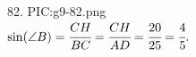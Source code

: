 82. {{PIC:g9-82.png}}\\
$\sin(\angle B)=\cfrac{CH}{BC}=\cfrac{CH}{AD}=\cfrac{20}{25}=\cfrac{4}{5}.$\newpage\noindent
